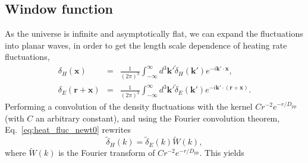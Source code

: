 \documentclass[numberedappendix]{emulateapj}
\begin{document}
% 

\subsection{Window function}
As the universe is infinite and asymptotically flat, we can expand the fluctuations into planar waves, in order to get the length scale dependence of heating rate fluctuations,
\begin{eqnarray}
  \label{eq:FT_delta}
  \delta_H(\mathbf{x})&=&\frac{1}{(2\pi)^3}\int_{-\infty}^{\infty} d^3\mathbf{k'} \tilde{\delta}_H(\mathbf{k'}) e^{-i\mathbf{k'}\cdot\mathbf{x}},\\ \nonumber
  \delta_E(\mathbf{r}+\mathbf{x})&=&\frac{1}{(2\pi)^3}\int_{-\infty}^{\infty} d^3\mathbf{k'} \tilde{\delta}_E(\mathbf{k'}) e^{-i\mathbf{k'}\cdot(\mathbf{r}+\mathbf{x})}.
\end{eqnarray}
Performing a convolution of the density fluctuations with the kernel $C r^{-2} e^{-r/D_{\mathrm{pp}}}$ (with $C$ an arbitrary constant), and using the Fourier convolution theorem, Eq.~\eqref{eq:heat_fluc_newt0} rewrites
\begin{equation}
   \label{eq:1}
\tilde{\delta}_H(k) = \tilde{\delta}_E(k) \tilde{W}(k),
 \end{equation}
where $\tilde{W}(k)$ is the Fourier transform of $C r^{-2} e^{-r/D_{\mathrm{pp}}}$. This yields


\end{document}
